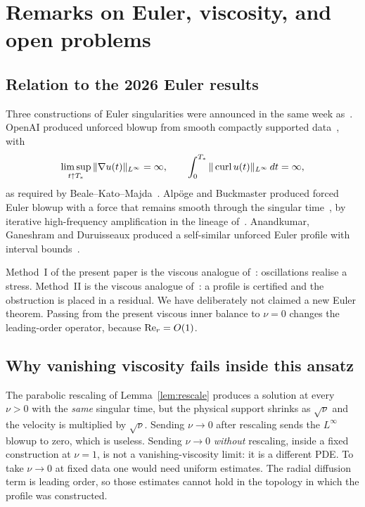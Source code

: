 \section{Remarks on {E}uler, viscosity, and open problems}
\label{sec:remarks}

\subsection{Relation to the 2026 {E}uler results}

Three constructions of {E}uler singularities were announced in the same week as~\cite{openai2026ns}. {O}pen{AI} produced unforced blowup from smooth compactly supported data~\cite{openai2026euler}, with
\[
\limsup_{t\uparrow T_*}\|\nabla u(t)\|_{L^\infty}=\infty,
\qquad
\int_0^{T_*}\|\operatorname{curl} u(t)\|_{L^\infty}\,dt=\infty,
\]
as required by {B}eale--{K}ato--{M}ajda~\cite{bkm1984}. {A}lp{\"o}ge and {B}uckmaster produced forced {E}uler blowup with a force that remains smooth through the singular time~\cite{alpoegbuckmaster2026}, by iterative high-frequency amplification in the lineage of~\cite{cmz2023}. {A}nandkumar, {G}aneshram and {D}uruisseaux produced a self-similar unforced {E}uler profile with interval bounds~\cite{anandkumar2026}.

Method~I of the present paper is the viscous analogue of~\cite{alpoegbuckmaster2026,openai2026ns}: oscillations realise a stress. Method~II is the viscous analogue of~\cite{chenhou2022,anandkumar2026}: a profile is certified and the obstruction is placed in a residual. We have deliberately not claimed a new {E}uler theorem. Passing from the present viscous inner balance to $\nu=0$ changes the leading-order operator, because $\mathrm{Re}_r=O(1)$.

\subsection{Why vanishing viscosity fails inside this ansatz}

The parabolic rescaling of Lemma~\ref{lem:rescale} produces a solution at every $\nu>0$ with the \emph{same} singular time, but the physical support shrinks as $\sqrt{\nu}$ and the velocity is multiplied by $\sqrt{\nu}$. Sending $\nu\to 0$ after rescaling sends the $L^\infty$ blowup to zero, which is useless. Sending $\nu\to 0$ \emph{without} rescaling, inside a fixed construction at $\nu=1$, is not a vanishing-viscosity limit: it is a different PDE. To take $\nu\to 0$ at fixed data one would need uniform estimates. The radial diffusion term is leading order, so those estimates cannot hold in the topology in which the profile was constructed.

